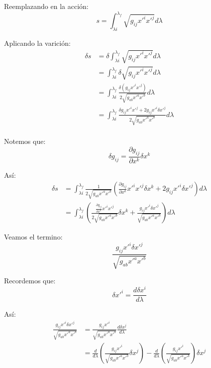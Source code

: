 \documentclass[paper=a4, fontsize=11pt,twoside]{scrartcl}
\begin{document}
Reemplazando en la acci\'on:
	\begin{equation*}
		s = \int^{\lambda_{f}}_{\lambda{i}} \sqrt{g_{ij}x'^{i}x'^{j}} d\lambda
	\end{equation*}

Aplicando la varici\'on:
	\begin{align*}
		\delta s &= \delta\int^{\lambda_{f}}_{\lambda{i}} \sqrt{g_{ij}x'^{i}x'^{j}} d\lambda \\
				 &= \int^{\lambda_{f}}_{\lambda{i}} \delta \sqrt{g_{ij}x'^{i}x'^{j}} d\lambda \\
				 &= \int^{\lambda_{f}}_{\lambda{i}} \frac{\delta\left( g_{ij}x'^{i}x'^{j} \right)}{2\sqrt{g_{ab}x'^{a}x'^{b}}} d\lambda \\
				 &= \int^{\lambda_{f}}_{\lambda{i}} \frac{\delta g_{ij}x'^{i}x'^{j} + 2g_{ij}x'^{i}\delta x'^{j}}{2\sqrt{g_{ab}x'^{a}x'^{b}}} d\lambda \\
	\end{align*}
	
Notemos que:
	\begin{equation*}
		\delta g_{ij} = \frac{\partial g_{ij}}{\partial x^{k}} \delta x^{k}
	\end{equation*}
	
As\'i: 
	\begin{align*}
		\delta s &= \int^{\lambda_{f}}_{\lambda{i}} \frac{1}{2\sqrt{g_{ab}x'^{a}x'^{b}}} \left(  \frac{\partial g_{ij}}{\partial x^{k}}x'^{i}x'^{j} \delta x^{k} + 2g_{ij}x'^{i}\delta x'^{j} \right) d\lambda \\
				 &= \int^{\lambda_{f}}_{\lambda{i}} \left( \frac{\frac{\partial g_{ij}}{\partial x^{k}}x'^{i}x'^{j}}{2\sqrt{g_{ab}x'^{a}x'^{b}}} \delta x^{k}
				                                        +  \frac{g_{ij}x'^{i}\delta x'^{j}}{\sqrt{g_{ab}x'^{a}x'^{b}}} \right) d\lambda 
	\end{align*}

Veamos el termino:
	\begin{equation*}
		\frac{g_{ij}x'^{i}\delta x'^{j}}{\sqrt{g_{ab}x'^{a}x'^{b}}}
	\end{equation*}

Recordemos que:
	\begin{equation*}
		\delta x'^{i} = \frac{d \delta x^{i}}{d\lambda}
	\end{equation*}

As\'i:
	\begin{align*}
		\frac{g_{ij}x'^{i}\delta x'^{j}}{\sqrt{g_{ab}x'^{a}x'^{b}}} &= \frac{g_{ij}x'^{i}}{\sqrt{g_{ab}x'^{a}x'^{b}}}\frac{d \delta x^{j}}{d\lambda} \\
																	&= \frac{d}{d\lambda} \left(\frac{g_{ij}x'^{i}}{\sqrt{g_{ab}x'^{a}x'^{b}}} \delta x^{j}\right) 
																	 - \frac{d}{d\lambda} \left( \frac{g_{ij}x'^{i}}{\sqrt{g_{ab}x'^{a}x'^{b}}} \right)\delta x^{j}
	\end{align*}
	
\end{document}
